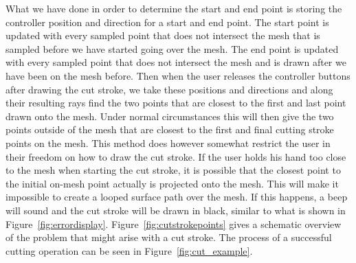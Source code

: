 What we have done in order to determine the start and end point is storing the controller position and direction for a start and end point. The start point is updated with every sampled point that does not intersect the mesh that is sampled before we have started going over the mesh. The end point is updated with every sampled point that does not intersect the mesh and is drawn after we have been on the mesh before. Then when the user releases the controller buttons after drawing the cut stroke, we take these positions and directions and along their resulting rays find the two points that are closest to the first and last point drawn onto the mesh. Under normal circumstances this will then give the two points outside of the mesh that are closest to the first and final cutting stroke points on the mesh. This method does however somewhat restrict the user in their freedom on how to draw the cut stroke. If the user holds his hand too close to the mesh when starting the cut stroke, it is possible that the closest point to the initial on-mesh point actually is projected onto the mesh. This will make it impossible to create a looped surface path over the mesh. If this happens, a beep will sound and the cut stroke will be drawn in black, similar to what is shown in Figure~\ref{fig:errordisplay}. Figure~\ref{fig:cutstrokepoints} gives a schematic overview of the problem that might arise with a cut stroke. The process of a successful cutting operation can be seen in Figure~\ref{fig:cut_example}.

